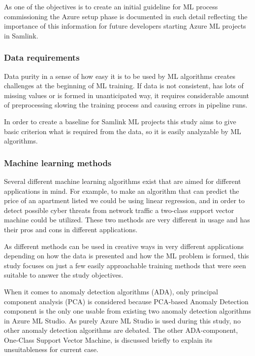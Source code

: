 As one of the objectives is to create
an initial guideline for ML process commissioning
the Azure setup phase is documented in such detail
reflecting the importance of this information
for future developers
starting Azure ML projects in Samlink.


\subsubsection*{Data requirements}
Data purity in a sense of
how easy it is to be used by ML algorithms
creates challenges at the beginning of ML training.
If data is not consistent,
has lots of missing values
or is formed in unanticipated way,
it requires considerable amount of preprocessing
slowing the training process
and causing errors in pipeline runs.

In order to create a baseline for Samlink ML projects
this study aims to give basic criterion
what is required from the data,
so it is easily analyzable by ML algorithms.


\subsubsection*{Machine learning methods}
Several different machine learning algorithms exist
that are aimed for different applications in mind.
For example,
to make an algorithm that can predict
the price of an apartment listed\cite{winky}
we could be using linear regression,
and in order to detect
possible cyber threats from network traffic\cite{ghanem}
a two-class support vector machine could be utilized.
These two methods are very different in usage
and has their pros and cons in different applications.

As different methods can be used in creative ways
in very different applications
depending on how the data is presented
and how the ML problem is formed,
this study focuses on
just a few easily approachable training methods
that were seen suitable to answer the study objectives.

When it comes to anomaly detection algorithms (ADA),
only principal component analysis (PCA) is considered
because PCA-based Anomaly Detection component is the only one usable
from existing two anomaly detection algorithms
in Azure ML Studio.
As purely Azure ML Studio is used during this study,
no other anomaly detection algorithms are debated.
The other ADA-component,
One-Class Support Vector Machine,
is discussed briefly to explain its unsuitableness for current case.

